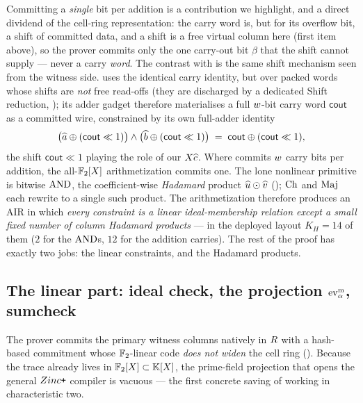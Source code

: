 Committing a \emph{single} bit per addition is a contribution we highlight,
and a direct dividend of the cell-ring representation: the carry word is, but
for its overflow bit, a shift of committed data, and a shift is a free virtual
column here (first item above), so the prover commits only the one carry-out
bit $\beta$ that the shift cannot supply --- never a carry \emph{word}. The
contrast with \binius{} is the same shift mechanism seen from the witness side.
\binius{} uses the identical carry identity, but over packed words whose shifts
are \emph{not} free read-offs (they are discharged by a dedicated Shift
reduction, ); its adder gadget therefore materialises a full
$w$-bit carry word $\mathsf{cout}$ as a committed wire, constrained by its
own full-adder identity
\[
  \bigl(\widehat{a}\oplus(\mathsf{cout}\ll 1)\bigr)\wedge
  \bigl(\widehat{b}\oplus(\mathsf{cout}\ll 1)\bigr)
  \;=\; \mathsf{cout}\oplus(\mathsf{cout}\ll 1),
\]
the shift $\mathsf{cout}\ll 1$ playing the role of our $X\widehat{c}$. Where
\binius{} commits $w$ carry bits per addition, the all-$\mathbb{F}_2[X]$
arithmetization commits one.
The lone nonlinear primitive is bitwise $\operatorname{AND}$, the coefficient-wise
\emph{Hadamard} product $\widehat{u}\odot\widehat{v}$ (); $\operatorname{Ch}$ and
$\operatorname{Maj}$ each rewrite to a single such product. The arithmetization therefore
produces an AIR in which \emph{every constraint is a linear
ideal-membership relation except a small fixed number of column Hadamard
products} --- in the deployed layout $K_H=14$ of them ($2$ for the $\operatorname{AND}$s,
$12$ for the addition carries). The rest of the proof has exactly two jobs:
the linear constraints, and the Hadamard products.

\subsection{The linear part: ideal check, the projection $\operatorname{ev}^{\mathrm{m}}_{\alpha}$, sumcheck}
\label{sec:overview-linear}

The prover commits the primary witness columns natively in $R$ with
a hash-based commitment whose $\mathbb{F}_2$-linear code \emph{does not widen} the
cell ring (). Because the trace already lives in
$\mathbb{F}_2[X]\subset\mathbb{K}[X]$, the prime-field projection that opens the general
$Zinc\texttt{+}$ compiler is vacuous --- the first concrete saving of working in
characteristic two.

